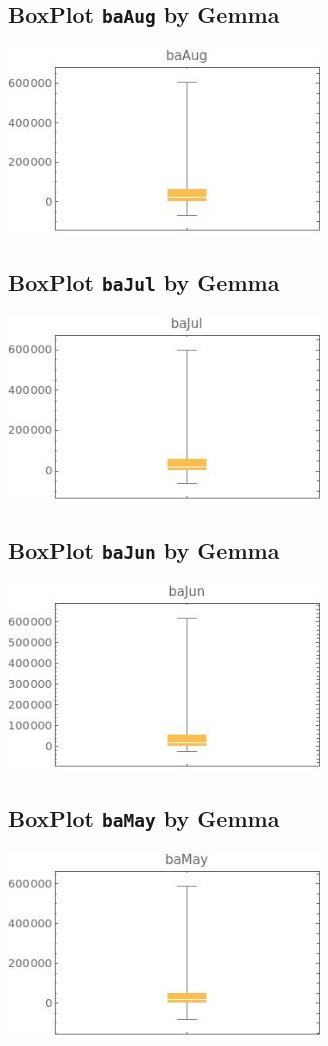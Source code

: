 \documentclass[a4paper]{article}
\begin{document}
\subsection{BoxPlot {\tt baAug} by Gemma}
\includegraphics[width=0.62\textwidth]{imgs/baAug.jpeg}

\subsection{BoxPlot {\tt baJul} by Gemma}
\includegraphics[width=0.62\textwidth]{imgs/baJul.jpeg}

\subsection{BoxPlot {\tt baJun} by Gemma}
\includegraphics[width=0.62\textwidth]{imgs/baJun.jpeg}

\subsection{BoxPlot {\tt baMay} by Gemma}
\includegraphics[width=0.62\textwidth]{imgs/baMay.jpeg}
\end{document}
